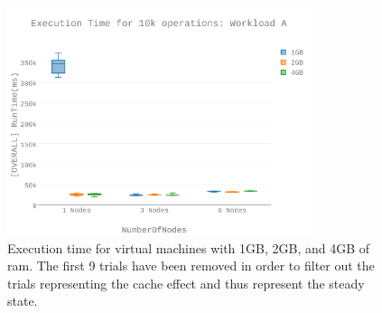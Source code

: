 \begin{figure}[h]
\includegraphics[width=3.5in]{Figures/figures-wle_fig4.pdf}

\caption{Execution time for virtual machines with 1GB, 2GB, and 4GB of \gls{ram}.  The first 9 trials have been removed in order to filter out the trials representing the cache effect and thus represent the steady state.}

\label{fig:figures-wle_fig4}
\end{figure}

